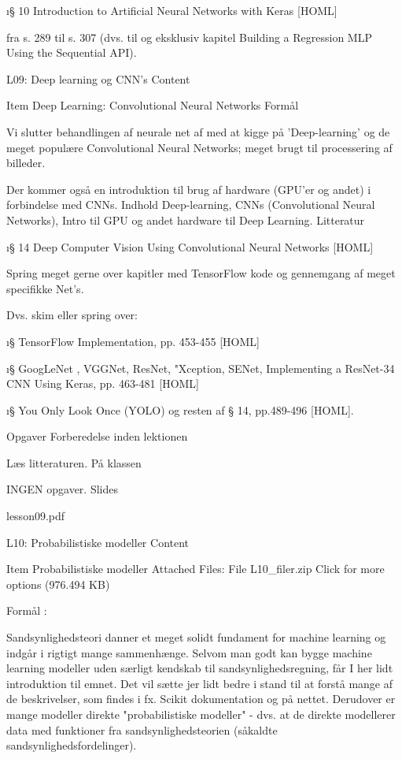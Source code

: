 \i{§ 10 Introduction to Artificial Neural Networks with Keras} [HOML]

fra s. 289 til s. 307 (dvs. til og eksklusiv kapitel Building a Regression MLP Using the Sequential API).





L09: Deep learning og CNN's
Content

    Item
    Deep Learning: Convolutional Neural Networks
    Formål

    Vi slutter behandlingen af neurale net af med at kigge på 'Deep-learning' og de meget populære Convolutional Neural Networks; meget brugt til processering af billeder.

    Der kommer også en introduktion til brug af hardware (GPU'er og andet) i forbindelse med CNNs.
    Indhold
        Deep-learning,
        CNNs (Convolutional Neural Networks),
        Intro til GPU og andet hardware til Deep Learning.
    Litteratur

    \i{§ 14 Deep Computer Vision Using Convolutional Neural Networks} [HOML]

    Spring meget gerne over kapitler med TensorFlow kode og gennemgang af meget specifikke  Net's.

    Dvs.  skim eller spring over:

    \i{§  TensorFlow Implementation},  pp. 453-455 [HOML]

    \i{§  GoogLeNet , VGGNet, ResNet, "Xception, SENet, Implementing a
    ResNet-34 CNN Using Keras}, pp.  463-481 [HOML]

    \i{§ You Only Look Once (YOLO)} og resten af § 14, pp.489-496 [HOML].

    Opgaver
    Forberedelse inden lektionen

    Læs litteraturen.
    På klassen

    INGEN opgaver.
    Slides

     lesson09.pdf


 L10: Probabilistiske modeller
Content

    Item
    Probabilistiske modeller
    Attached Files:
        File L10_filer.zip Click for more options (976.494 KB)

    Formål :

    Sandsynlighedsteori danner et meget solidt fundament for machine learning og indgår i rigtigt mange sammenhænge. Selvom man godt kan bygge machine learning modeller uden særligt kendskab til sandsynlighedsregning, får I her lidt introduktion til emnet. Det vil sætte jer lidt bedre i stand til at forstå mange af de beskrivelser, som findes i fx. Scikit dokumentation og på nettet. Derudover er mange modeller direkte "probabilistiske modeller" - dvs. at de direkte modellerer data med funktioner fra sandsynlighedsteorien (såkaldte sandsynlighedsfordelinger).


